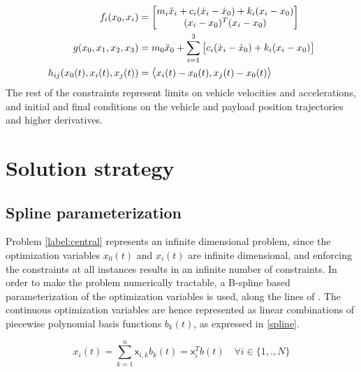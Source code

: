 \documentclass[letterpaper, 10 pt, conference]{ieeeconf}
\newcommand{\cx}{\textsf{x}}
\begin{document}
 \begin{equation}\label{eq:cons}
 \begin{aligned}
 f_i(x_0,x_i) &=
 \begin{bmatrix}
   m_i\ddot{x}_i + c_i(\dot{x}_i-\dot{x}_0) + k_i(x_i-x_0) \\
  (x_i-x_0)^T(x_i-x_0)
 \end{bmatrix} \\
 g(x_0,x_1,x_2,x_3) &= m_0\ddot{x}_0 +  \sum\limits_{i=1}^{3}
 \begin{bmatrix}{c_i(\dot{x}_i-\dot{x}_0) + k_i(x_i - x_0)} \end{bmatrix}\\
 h_{ij}(x_0(t),x_i(t),x_j(t)) &= \mathlarger{\langle} x_i(t) - x_0(t),x_j(t) - x_0(t) \mathlarger{\rangle}
 \end{aligned}
 \end{equation}
 The rest of the constraints represent limits on vehicle velocities and accelerations, and initial and final conditions on the vehicle and payload position trajectories and higher derivatives.
\section{Solution strategy}
\subsection{Spline parameterization}
Problem \eqref{label:central} represents an infinite dimensional problem, since the optimization variables $x_0(t)$ and $x_i(t)$ are infinite dimensional, and enforcing the constraints at all instances results in an infinite number of constraints. In order to make the problem numerically tractable, a B-spline based parameterization of the optimization variables is used, along the lines of \cite{c15}. The continuous optimization variables are hence represented as linear combinations of piecewise polynomial basis functions $b_k(t)$, as expressed in \eqref{spline}.

\begin{equation}\label{spline}
x_i(t) = \sum\limits_{k=1}^{n} \cx_{i,k}b_k(t) = \cx_i^Tb(t) \quad \forall i \in \{1,.,N\}
\end{equation}
\end{document}
